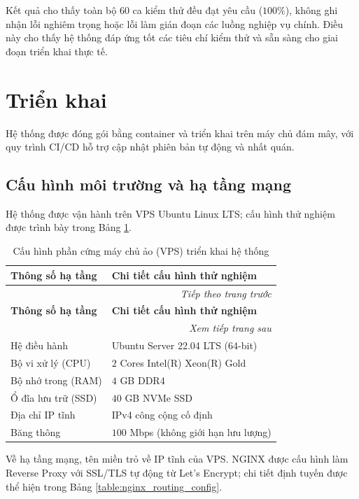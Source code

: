 \documentclass[../DoAn.tex]{subfiles}
\begin{document}
Kết quả cho thấy toàn bộ $60$ ca kiểm thử đều đạt yêu cầu ($100\%$), không ghi nhận lỗi nghiêm trọng hoặc lỗi làm gián đoạn các luồng nghiệp vụ chính. Điều này cho thấy hệ thống đáp ứng tốt các tiêu chí kiểm thử và sẵn sàng cho giai đoạn triển khai thực tế.
\section{Triển khai}
\label{section:4.5}

Hệ thống được đóng gói bằng container và triển khai trên máy chủ đám mây, với quy trình CI/CD hỗ trợ cập nhật phiên bản tự động và nhất quán.

\subsection{Cấu hình môi trường và hạ tầng mạng}
\label{subsection:4.5.1}

Hệ thống được vận hành trên VPS Ubuntu Linux LTS; cấu hình thử nghiệm được trình bày trong Bảng \ref{table:vps_hardware_spec}.

\begin{longtable}{|p{}|p{}|}
    \caption{Cấu hình phần cứng máy chủ ảo (VPS) triển khai hệ thống}
    \label{table:vps_hardware_spec}\\
    \hline
    \textbf{Thông số hạ tầng} & \textbf{Chi tiết cấu hình thử nghiệm} \\ \hline
    \endfirsthead
    \multicolumn{2}{r}{\textit{Tiếp theo trang trước}} \\
    \hline
    \textbf{Thông số hạ tầng} & \textbf{Chi tiết cấu hình thử nghiệm} \\ \hline
    \endhead
    \hline
    \multicolumn{2}{r}{\textit{Xem tiếp trang sau}} \\
    \endfoot
    \hline
    \endlastfoot
    Hệ điều hành & Ubuntu Server 22.04 LTS (64-bit) \\ \hline
    Bộ vi xử lý (CPU) & $2$ Cores Intel(R) Xeon(R) Gold \\ \hline
    Bộ nhớ trong (RAM) & $4$ GB DDR4 \\ \hline
    Ổ đĩa lưu trữ (SSD) & $40$ GB NVMe SSD \\ \hline
    Địa chỉ IP tĩnh & IPv4 công cộng cố định \\ \hline
    Băng thông & $100$ Mbps (không giới hạn lưu lượng) \\ \hline
\end{longtable}

Về hạ tầng mạng, tên miền  trỏ về IP tĩnh của VPS. NGINX \cite{nginx_docs2026} được cấu hình làm Reverse Proxy với SSL/TLS tự động từ Let's Encrypt; chi tiết định tuyến được thể hiện trong Bảng \ref{table:nginx_routing_config}.
\end{document}
